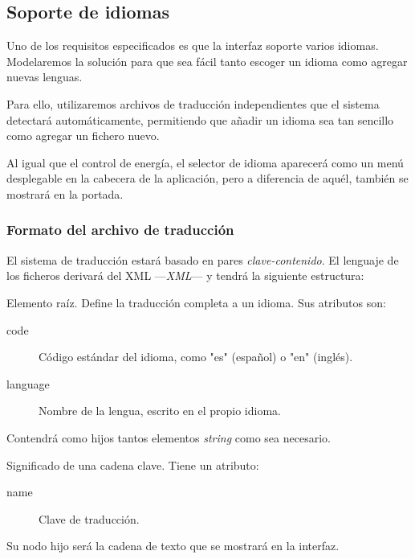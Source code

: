 \smallskip

\subsection{Soporte de idiomas}

Uno de los requisitos especificados es que la interfaz soporte varios idiomas. Modelaremos la solución para que sea fácil tanto escoger un idioma como agregar nuevas lenguas.

Para ello, utilizaremos archivos de traducción independientes que el sistema detectará automáticamente, permitiendo que añadir un idioma sea tan sencillo como agregar un fichero nuevo.

Al igual que el control de energía, el selector de idioma aparecerá como un menú desplegable en la cabecera de la aplicación, pero a diferencia de aquél, también se mostrará en la portada.

\subsubsection{Formato del archivo de traducción}

El sistema de traducción estará basado en pares \textit{clave-contenido}. El lenguaje de los ficheros derivará del \acrshort{XML} ---\textit{\acrlong{XML}}--- y tendrá la siguiente estructura:

\begin{description}[style=nextline]
	\item[translation]
	Elemento raíz. Define la traducción completa a un idioma. Sus atributos son:
	
	\begin{description}
		\item[code] Código estándar del idioma, como "es" (español) o "en" (inglés).
		\item[language] Nombre de la lengua, escrito en el propio idioma.
	\end{description}
	
	Contendrá como hijos tantos elementos \textit{string} como sea necesario.
	
	\item[string]
	Significado de una cadena clave. Tiene un atributo:
	
	\begin{description}
		\item[name] Clave de traducción.
	\end{description}
	
	Su nodo hijo será la cadena de texto que se mostrará en la interfaz.
\end{description}

